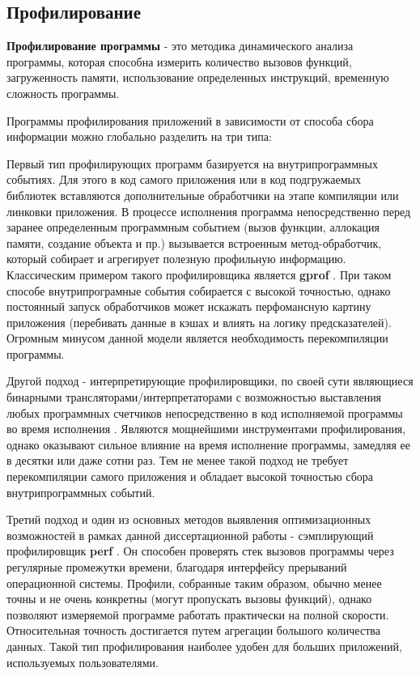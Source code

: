 \subsection {Профилирование}\label{p1:optop:profile}
\textbf{Профилирование программы}  - это методика динамического анализа программы, которая способна измерить количество вызовов функций, загруженность памяти, использование определенных инструкций,  временную сложность программы.

Программы профилирования приложений в зависимости от способа сбора информации можно глобально разделить на три типа:

Первый тип профилирующих программ базируется на внутрипрограммных событиях. Для этого в код самого приложения или в код подгружаемых библиотек  вставляются дополнительные обработчики на этапе компиляции или линковки приложения. В процессе исполнения программа непосредственно перед заранее определенным программным событием (вызов функции, аллокация памяти, создание объекта и пр.) вызывается встроенным метод-обработчик, который собирает и агрегирует полезную профильную информацию. Классическим примером такого профилировщика является \textbf{gprof} \cite{graham2004gprof}. При таком способе внутрипрограмные события собирается с высокой точностью, однако постоянный запуск обработчиков может искажать перфомансную картину приложения (перебивать данные в кэшах и  влиять на логику предсказателей). Огромным минусом данной модели является необходимость перекомпиляции программы.

Другой подход - интерпретирующие профилировщики, по своей сути являющиеся бинарными трансляторами/интерпретаторами с возможностью выставления любых программных счетчиков непосредственно в код исполняемой программы во время исполнения \cite{reinders2005vtune, nethercote2007valgrind}. Являются мощнейшими инструментами профилирования, однако оказывают сильное влияние на время исполнение программы, замедляя ее в десятки или даже сотни раз. Тем не менее такой подход не требует перекомпиляции самого приложения и обладает высокой точностью сбора внутрипрограммных событий.

Третий подход и один из основных методов выявления оптимизационных возможностей в рамках данной диссертационной работы -  сэмплирующий профилировщик \textbf{perf} \cite{de2010new}. Он способен проверять стек вызовов программы через регулярные промежутки времени, благодаря интерфейсу прерываний операционной системы. Профили, собранные таким образом, обычно менее точны и не очень конкретны (могут пропускать вызовы функций), однако позволяют измеряемой программе работать практически на полной скорости. Относительная точность достигается путем агрегации большого количества данных. Такой тип профилирования наиболее удобен для больших приложений, используемых пользователями.


